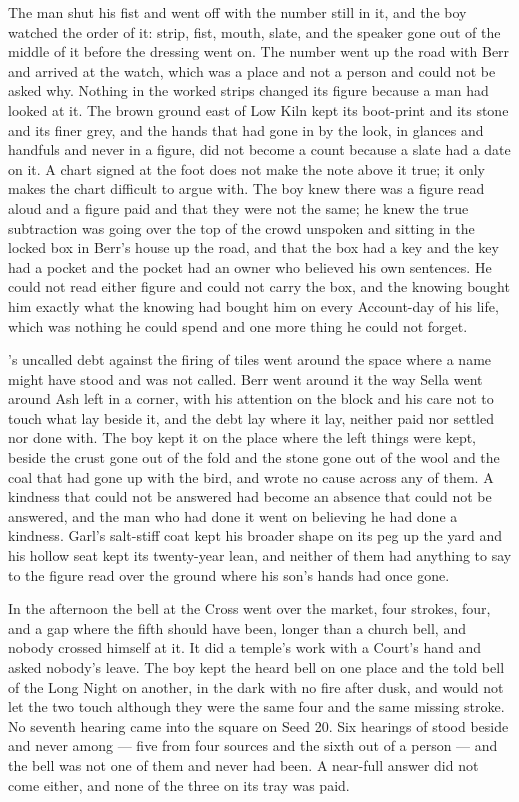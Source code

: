The man shut his fist and went off with the number still in it, and the boy watched the order of it: strip, fist, mouth, slate, and the speaker gone out of the middle of it before the dressing went on. The number went up the road with Berr and arrived at the watch, which was a place and not a person and could not be asked why. Nothing in the worked strips changed its figure because a man had looked at it. The brown ground east of Low Kiln kept its boot-print and its stone and its finer grey, and the hands that had gone in by the look, in glances and handfuls and never in a figure, did not become a count because a slate had a date on it. A chart signed at the foot does not make the note above it true; it only makes the chart difficult to argue with. The boy knew there was a figure read aloud and a figure paid and that they were not the same; he knew the true subtraction was going over the top of the crowd unspoken and sitting in the locked box in Berr's house up the road, and that the box had a key and the key had a pocket and the pocket had an owner who believed his own sentences. He could not read either figure and could not carry the box, and the knowing bought him exactly what the knowing had bought him on every Account-day of his life, which was nothing he could spend and one more thing he could not forget.

's uncalled debt against the firing of tiles went around the space where a name might have stood and was not called. Berr went around it the way Sella went around Ash left in a corner, with his attention on the block and his care not to touch what lay beside it, and the debt lay where it lay, neither paid nor settled nor done with. The boy kept it on the place where the left things were kept, beside the crust gone out of the fold and the stone gone out of the wool and the coal that had gone up with the bird, and wrote no cause across any of them. A kindness that could not be answered had become an absence that could not be answered, and the man who had done it went on believing he had done a kindness. Garl's salt-stiff coat kept his broader shape on its peg up the yard and his hollow seat kept its twenty-year lean, and neither of them had anything to say to the figure read over the ground where his son's hands had once gone.

In the afternoon the bell at the Cross went over the market, four strokes, four, and a gap where the fifth should have been, longer than a church bell, and nobody crossed himself at it. It did a temple's work with a Court's hand and asked nobody's leave. The boy kept the heard bell on one place and the told bell of the Long Night on another, in the dark with no fire after dusk, and would not let the two touch although they were the same four and the same missing stroke. No seventh hearing came into the square on Seed 20. Six hearings of  stood beside and never among --- five from four sources and the sixth out of a person --- and the bell was not one of them and never had been. A near-full answer did not come either, and none of the three on its tray was paid.

